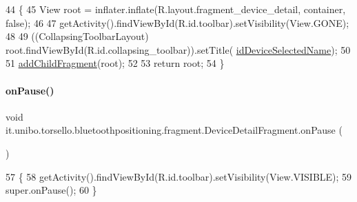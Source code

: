 \begin{DoxyCode}
44                                                                                                       \{
45         View root = inflater.inflate(R.layout.fragment\_device\_detail, container, \textcolor{keyword}{false});
46 
47         getActivity().findViewById(R.id.toolbar).setVisibility(View.GONE);
48 
49         ((CollapsingToolbarLayout) root.findViewById(R.id.collapsing\_toolbar)).setTitle(
      \hyperlink{classit_1_1unibo_1_1torsello_1_1bluetoothpositioning_1_1fragment_1_1DeviceDetailFragment_a6d52d8371a07fb8da75879758d1d6942_a6d52d8371a07fb8da75879758d1d6942}{idDeviceSelectedName});
50 
51         \hyperlink{classit_1_1unibo_1_1torsello_1_1bluetoothpositioning_1_1fragment_1_1DeviceDetailFragment_a62c541b8382a522f06a5d9c56cf50b26_a62c541b8382a522f06a5d9c56cf50b26}{addChildFragment}(root);
52 
53         \textcolor{keywordflow}{return} root;
54     \}
\end{DoxyCode}
\hypertarget{classit_1_1unibo_1_1torsello_1_1bluetoothpositioning_1_1fragment_1_1DeviceDetailFragment_a1ed4762356dd3067ce48aa73da50404e_a1ed4762356dd3067ce48aa73da50404e}{}\label{classit_1_1unibo_1_1torsello_1_1bluetoothpositioning_1_1fragment_1_1DeviceDetailFragment_a1ed4762356dd3067ce48aa73da50404e_a1ed4762356dd3067ce48aa73da50404e} 
\paragraph{\texorpdfstring{on\+Pause()}{onPause()}}
{\footnotesize\ttfamily void it.\+unibo.\+torsello.\+bluetoothpositioning.\+fragment.\+Device\+Detail\+Fragment.\+on\+Pause (\begin{DoxyParamCaption}{ }\end{DoxyParamCaption})}


\begin{DoxyCode}
57                           \{
58         getActivity().findViewById(R.id.toolbar).setVisibility(View.VISIBLE);
59         super.onPause();
60     \}
\end{DoxyCode}


